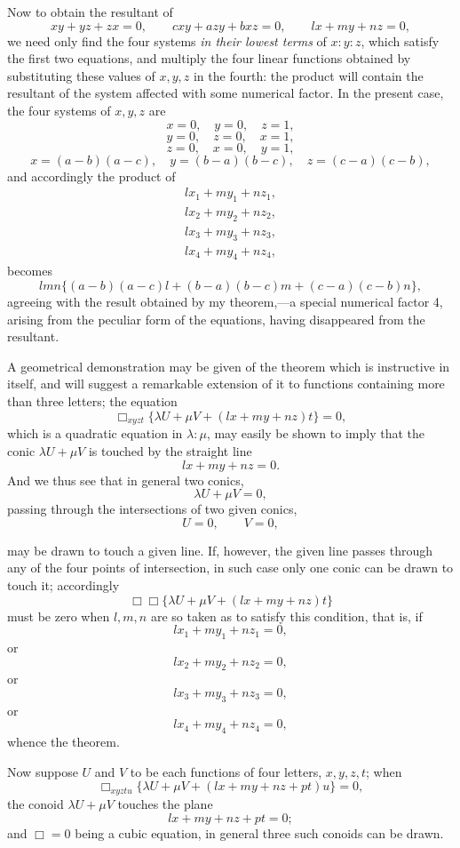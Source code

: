 \documentclass[11pt]{article}
\newcommand{\sourcepage}[1]{\marginpar{\scriptsize p.~#1}}
\begin{document}
{{\sourcepage{141}
Now to obtain the resultant of
\[
xy+yz+zx=0,\qquad
cxy+azy+bxz=0,\qquad
lx+my+nz=0,
\]
we need only find the four systems \emph{in their lowest terms} of $x:y:z$, which satisfy the first two equations, and multiply the four linear functions obtained by substituting these values of $x,y,z$ in the fourth: the product will contain the resultant of the system affected with some numerical factor. In the present case, the four systems of $x,y,z$ are
\[
x=0,\quad y=0,\quad z=1,
\]
\[
y=0,\quad z=0,\quad x=1,
\]
\[
z=0,\quad x=0,\quad y=1,
\]
\[
x=(a-b)(a-c),\quad y=(b-a)(b-c),\quad z=(c-a)(c-b),
\]
and accordingly the product of
\[
\begin{gathered}
lx_1+my_1+nz_1,\\
lx_2+my_2+nz_2,\\
lx_3+my_3+nz_3,\\
lx_4+my_4+nz_4,
\end{gathered}
\]
becomes
\[
lmn\{(a-b)(a-c)l+(b-a)(b-c)m+(c-a)(c-b)n\},
\]
agreeing with the result obtained by my theorem,---a special numerical factor 4, arising from the peculiar form of the equations, having disappeared from the resultant.

A geometrical demonstration may be given of the theorem which is instructive in itself, and will suggest a remarkable extension of it to functions containing more than three letters; the equation
\[
\Box_{xyzt}\{\lambda U+\mu V+(lx+my+nz)t\}=0,
\]
which is a quadratic equation in $\lambda:\mu$, may easily be shown to imply that the conic $\lambda U+\mu V$ is touched by the straight line
\[
lx+my+nz=0.
\]
And we thus see that in general two conics,
\[
\lambda U+\mu V=0,
\]
passing through the intersections of two given conics,
\[
U=0,\qquad V=0,
\]

\sourcepage{142}
may be drawn to touch a given line. If, however, the given line passes through any of the four points of intersection, in such case only one conic can be drawn to touch it; accordingly
\[
\Box\Box\{\lambda U+\mu V+(lx+my+nz)t\}
\]
must be zero when $l,m,n$ are so taken as to satisfy this condition, that is, if
\[
lx_1+my_1+nz_1=0,
\]
or
\[
lx_2+my_2+nz_2=0,
\]
or
\[
lx_3+my_3+nz_3=0,
\]
or
\[
lx_4+my_4+nz_4=0,
\]
whence the theorem.

Now suppose $U$ and $V$ to be each functions of four letters, $x,y,z,t$; when
\[
\Box_{xyztu}\{\lambda U+\mu V+(lx+my+nz+pt)u\}=0,
\]
the conoid $\lambda U+\mu V$ touches the plane
\[
lx+my+nz+pt=0;
\]
and $\Box=0$ being a cubic equation, in general three such conoids can be drawn.

}}
\end{document}
